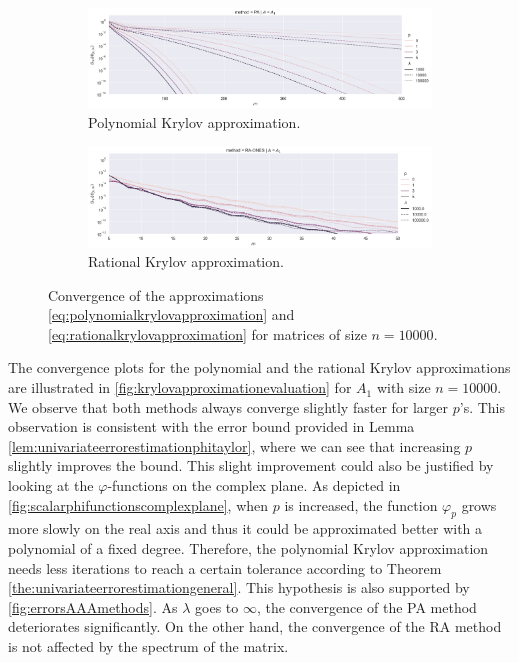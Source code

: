\begin{figure}[h!]
    \centering
    \begin{subfigure}[b]{.9\textwidth}
        \includegraphics[width=\textwidth]{img/krylovapproximation/cnvg_ps_PA_n1e04.png}
        \caption{Polynomial Krylov approximation.}
        \label{fig:polynomialkrylovapproximationevaluation}
    \end{subfigure}
    \vfill
    \begin{subfigure}[b]{.9\textwidth}
        \includegraphics[width=\textwidth]{img/krylovapproximation/cnvg_ps_RA-ONES_n1e04.png}
        \caption{Rational Krylov approximation.}
        \label{fig:rationalkrylovapproximationevaluation}
    \end{subfigure}
    \caption{
        Convergence of the approximations \eqref{eq:polynomialkrylovapproximation}
        and \eqref{eq:rationalkrylovapproximation} for matrices of size $n=10000$.
    }
    \label{fig:krylovapproximationevaluation}
\end{figure}

The convergence plots for the polynomial and the rational Krylov approximations are
illustrated in \autoref{fig:krylovapproximationevaluation} for $A_1$ with size $n=10000$.
We observe that both methods always converge slightly faster for larger $p$'s.
This observation is consistent with the error bound provided in Lemma
\ref{lem:univariateerrorestimationphitaylor}, where we can see that increasing $p$ slightly
improves the bound. This slight improvement could also be justified by looking at the
$\varphi$-functions on the complex plane. As depicted in
\autoref{fig:scalarphifunctionscomplexplane}, when $p$ is increased, the
function $\varphi_p$ grows more slowly on the real axis and thus it could be approximated
better with a polynomial of a fixed degree.
Therefore, the polynomial Krylov approximation needs less iterations to reach a certain tolerance according
to Theorem \ref{the:univariateerrorestimationgeneral}.
This hypothesis is also supported by \autoref{fig:errorsAAAmethods}.
As $\lambda$ goes to $\infty$, the convergence of the PA method deteriorates significantly.
On the other hand, the convergence of the RA method is not affected by the spectrum
of the matrix.


